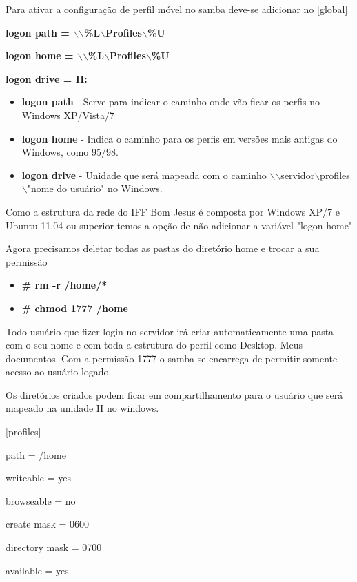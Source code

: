 Para ativar a configuração de perfil móvel no samba deve-se adicionar no [global] 

\textbf	{logon path = $\backslash$$\backslash$\%L$\backslash$Profiles$\backslash$\%U}

\textbf {logon home = $\backslash$$\backslash$\%L$\backslash$Profiles$\backslash$\%U}

\textbf	{logon drive = H:}

\begin{itemize}
	\item \textbf{logon path} - Serve para indicar o caminho onde vão ficar os perfis no Windows XP/Vista/7 
	\item \textbf{logon home} - Indica o caminho para os perfis em versões mais antigas do Windows, como 95/98.
	\item \textbf{logon drive} - Unidade que será mapeada com o caminho $\backslash$$\backslash$servidor$\backslash$profiles$\backslash$"nome do usuário" no Windows.
\end{itemize}

Como a estrutura da rede do IFF Bom Jesus é composta por Windows XP/7 e Ubuntu 11.04 ou superior temos a opção de não adicionar a variável "logon home" 

Agora precisamos deletar todas as pastas do diretório home e trocar a sua permissão 

\begin{itemize}
	\item \textbf{\# rm -r /home/*}
	\item \textbf{\# chmod 1777 /home}
\end{itemize}

Todo usuário que fizer login no servidor irá criar automaticamente uma pasta com o seu nome e com toda a estrutura do perfil como Desktop, Meus documentos. Com a permissão 1777 o samba se encarrega de permitir somente acesso ao usuário logado.

Os diretórios criados podem ficar em compartilhamento para o usuário que será mapeado na unidade H no windows.

[profiles] 

	path = /home 
	
	writeable = yes 
	
	browseable = no 
	
	create mask = 0600 
	
	directory mask = 0700 
	
	available = yes 

